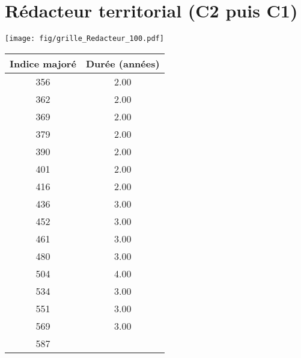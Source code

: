 \newpage 
 
\chapter{Rédacteur territorial (C2 puis C1)} 

\begin{minipage}{0.55\linewidth}\texttt{[image: fig/grille\_Redacteur\_100.pdf]}\end{minipage} 
\begin{minipage}{0.3\linewidth} 
 \begin{center} 

\begin{tabular}[htb]{|c|c|} 
\hline 
 Indice majoré &  Durée (années) \\ 
\hline \hline 
 356 &  2.00 \\ 
\hline 
 362 &  2.00 \\ 
\hline 
 369 &  2.00 \\ 
\hline 
 379 &  2.00 \\ 
\hline 
 390 &  2.00 \\ 
\hline 
 401 &  2.00 \\ 
\hline 
 416 &  2.00 \\ 
\hline 
 436 &  3.00 \\ 
\hline 
 452 &  3.00 \\ 
\hline 
 461 &  3.00 \\ 
\hline 
 480 &  3.00 \\ 
\hline 
 504 &  4.00 \\ 
\hline 
 534 &  3.00 \\ 
\hline 
 551 &  3.00 \\ 
\hline 
 569 &  3.00 \\ 
\hline 
 587 &   \\ 
\hline 
\hline 
\end{tabular} 
\end{center} 
 \end{minipage} 

~\\ 
 


   
 \localtableofcontents 

